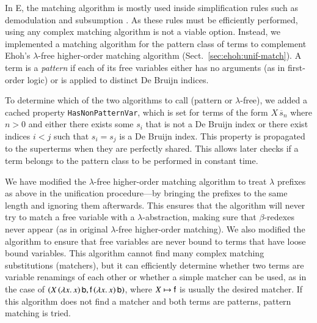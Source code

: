 In E, the matching algorithm is mostly used inside
simplification rules such as demodulation and subsumption \cite{ss-02-brainiac}.
As these rules must be efficiently performed, using any complex matching
algorithm is not a viable option. Instead, we implemented a matching algorithm
for the pattern class of terms \cite{tn-93-patterns} to complement Ehoh's
$\lambda$-free higher-order matching algorithm (Sect.~\ref{sec:ehoh:unif-match}).
A term is a \emph{pattern} if each of its free variables either
has no arguments (as in first-order logic) or is applied to distinct De Bruijn
indices.

To determine which of the two algorithms to call (pattern or $\lambda$-free), we
added a cached property \texttt{HasNonPatternVar}, which is set for terms of the
form $X \,
\overline{s}_n$ where $n>0$ and either there exists some $s_i$ that is not a De Bruijn
index or there exist indices $i < j$ such that $s_i = s_j$ is
a De Bruijn index. This property is propagated to the superterms when they are
perfectly shared. This allows later checks if a term belongs to the pattern
class to be performed in constant time.


We have modified the $\lambda$-free higher-order matching algorithm to treat
$\lambda$ prefixes as above in the unification procedure---by bringing the prefixes
to the same length and ignoring them afterwards. This ensures that the
algorithm will never try to match a free variable with a $\lambda$-abstraction,
making sure that $\beta$-redexes never appear (as in original $\lambda$-free
higher-order matching). We also modified the algorithm to ensure that free variables
are never bound to terms that have loose bound variables. This algorithm cannot
find many complex matching substitutions (matchers), but it can
efficiently determine whether two terms are variable renamings of each other
or whether a simple matcher can be used, as in the case of $(X \, (\lambda x. \,x) \,
\mathsf{b}, \mathsf{f} \, (\lambda x. \,x) \, \mathsf{b})$, where ${X \mapsto \mathsf{f}}$ is
usually the desired matcher. If this algorithm does not find a matcher and both
terms are patterns, pattern matching is tried.

